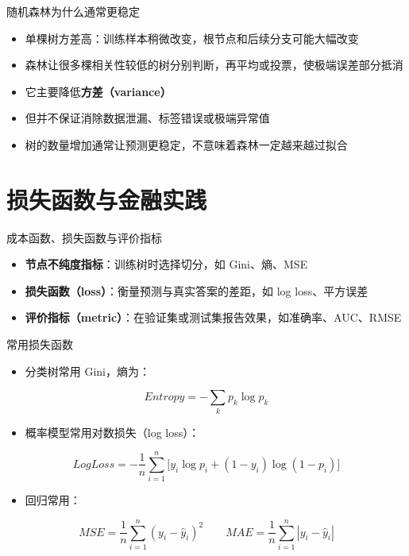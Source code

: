 \documentclass[10pt,aspectratio=43]{beamer}
\begin{document}
\begin{frame}{随机森林为什么通常更稳定}
  \vfill
  \begin{itemize}
    \item 单棵树方差高：训练样本稍微改变，根节点和后续分支可能大幅改变
    \item 森林让很多棵相关性较低的树分别判断，再平均或投票，使极端误差部分抵消
    \item 它主要降低\textbf{方差（variance）}
    \item 但并不保证消除数据泄漏、标签错误或极端异常值
    \item 树的数量增加通常让预测更稳定，不意味着森林一定越来越过拟合
  \end{itemize}
  \vfill
\end{frame}

\section{损失函数与金融实践}

\begin{frame}{成本函数、损失函数与评价指标}
  \vfill
  \begin{itemize}
    \item \textbf{节点不纯度指标}：训练树时选择切分，如 Gini、熵、MSE
    \item \textbf{损失函数（loss）}：衡量预测与真实答案的差距，如 log loss、平方误差
    \item \textbf{评价指标（metric）}：在验证集或测试集报告效果，如准确率、AUC、RMSE
  \end{itemize}
  \vfill
\end{frame}

\begin{frame}{常用损失函数}
  \begin{itemize}
    \item 分类树常用 Gini，熵为：
  \end{itemize}
  \[
    Entropy=-\sum_k p_k\log p_k
  \]
  \begin{itemize}
    \item 概率模型常用对数损失（log loss）：
  \end{itemize}
  \[
    LogLoss=-\frac{1}{n}\sum_{i=1}^{n}\bigl[y_i\log p_i+(1-y_i)\log(1-p_i)\bigr]
  \]
  \begin{itemize}
    \item 回归常用：
  \end{itemize}
  \[
    MSE=\frac{1}{n}\sum_{i=1}^{n}\left(y_i-\hat{y}_i\right)^2
    \qquad
    MAE=\frac{1}{n}\sum_{i=1}^{n}\left|y_i-\hat{y}_i\right|
  \]
\end{frame}
\end{document}
